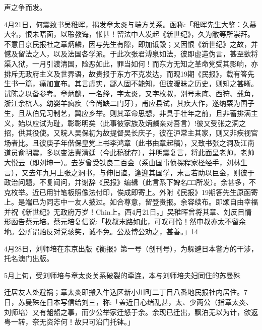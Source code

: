 \vfill
\begin{BookNotes}
\end{BookNotes}

\noindent 声之争而发。

4月21日，何震致书吴稚晖，揭发章太炎与端方关系。函称:「稚晖先生大鉴：久慕大名，恨未晤面，以聆教诲，怅甚！留法中人发起《新世纪》，久为敝等所崇拜。不意日京民报社之章炳麟，因与先生有隙，即加诋毁；又因恨《新世纪》之故，并憾及留法之人，以及法国各学派。于此次张君溥泉如法，彼即虚造伪言，甚至欲将渠入狱，一月引渡清国，险恶如此，罪当如何！而东方无知之革命党受其影响，亦排斥无政府主义及世界语，故贵报于东方不克发达，而观19期《民报》，载有答先生书一篇，痛加宣布。其言虚实，鄙人固不能知，但彼暧昧之历史，则知之甚晰。试陈之以备参考。章炳麟，一名绛，字太炎，又字枚叔，别号末底、西狩、载角，浙江余杭人。幼婴羊疯疾（今尚缺二门牙），甫应县试，其疾大作，遂纳粟为国子生，且从伯兄习制艺，冀应乡举。则其革命思想，非具于壮年之前，且非蓄排满主义，始以应试为耻，彰彰明矣（此事彼家族及炳麟亲对吾言）!彼又受张之洞之招，供其役使。又皖人吴保初为故提督吴长庆子，彼在沪常主其家，则又非疾视官场者比。且彼庚子年偕保皇党上书李鸿章（此书由章起稿），又致书张之洞及江南道员俞明震，多以变法冀清廷（今此稿犹存），并明震复言，将此面呈老帅，老帅大悦云（即刘坤一）。去岁曾受铁良二百金（系由国事侦探程家柽经手，刘林生言），又去年九月上张之洞书，与伸旧谊，逢迎其国学，末言若助以巨金，则彼于政治问题，不复闻问，并谢辞《民报》编辑（此言系下婢名□□所发）。余甚多，不克枚举。近已用针笔板照像法付印，俟成即寄上。外附《民报》19期答先生原函寄上。是端已为同志中一友人披过。如合尊意，留登贵报。余容续布。即颂自由幸福并祝《新世纪》无政府万岁！Chin上。西4月21日。」吴稚晖曾将其章、刘反目情形函告蔡元培。蔡元培复信说:「枚叔末路如此，可叹可怜！然申叔亦太不留余地。公所谓贻反对党骇笑，诚不免。公及博公劝之，甚善。」14

4月28日，刘师培在东京出版《衡报》第一号（创刊号），为躲避日本警方的干涉，托名澳门出版。

5月上旬，受刘师培与章太炎关系破裂的牵连，本与刘师培夫妇同住的苏曼殊

\vfill
\begin{BookNotes}
\end{BookNotes}

\noindent 迁居友人处避祸；章太炎即搬入牛込区新小川町二丁目八番地民报社内居住。7日，苏曼殊在日本写信给刘三，称:「盖近日心绪乱甚，太、少两公（指章太炎、刘师培）又有龃龉之事，而少公举家迁怒于余。余现已迁出，飘泊无以为计，欲返粤一转，奈无资斧何！故只可沿门托钵。」

